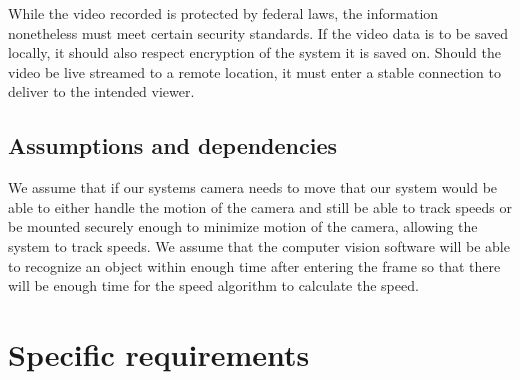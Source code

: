 \documentclass[letterpaper,10pt,onecolumn,draftclsnofoot]{IEEEtran}
\begin{document}
While the video recorded is protected by federal laws, the information nonetheless must meet certain security standards.
If the video data is to be saved locally, it should also respect encryption of the system it is saved on.
Should the video be live streamed to a remote location, it must enter a stable connection to deliver to the intended viewer.

\subsection{Assumptions and dependencies}
We assume that if our systems camera needs to move that our system would be able to either handle the motion of the camera and still be able to track speeds or be mounted securely enough to minimize motion of the camera, allowing the system to track speeds.
We assume that the computer vision software will be able to recognize an object within enough time after entering the frame so that there will be enough time for the speed algorithm to calculate the speed.
\section{Specific requirements}
\end{document}
